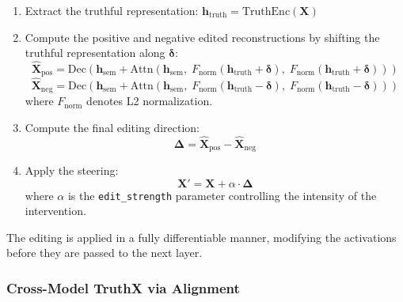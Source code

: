\begin{enumerate}
    \item Extract the truthful representation: $\mathbf{h}_{\mathrm{truth}} = \mathrm{TruthEnc}(\mathbf{X})$
    \item Compute the positive and negative edited reconstructions by shifting the truthful representation along $\boldsymbol{\delta}$:
    \begin{equation}
    \label{eq:truthx_edit_xpos}
    \hat{\mathbf{X}}_{\mathrm{pos}} = \mathrm{Dec}\!\left(\mathbf{h}_{\mathrm{sem}} + \mathrm{Attn}\!\left(\mathbf{h}_{\mathrm{sem}},\; F_{\mathrm{norm}}(\mathbf{h}_{\mathrm{truth}} + \boldsymbol{\delta}),\; F_{\mathrm{norm}}(\mathbf{h}_{\mathrm{truth}} + \boldsymbol{\delta})\right)\right)
    \end{equation}
    \begin{equation}
    \label{eq:truthx_edit_xneg}
    \hat{\mathbf{X}}_{\mathrm{neg}} = \mathrm{Dec}\!\left(\mathbf{h}_{\mathrm{sem}} + \mathrm{Attn}\!\left(\mathbf{h}_{\mathrm{sem}},\; F_{\mathrm{norm}}(\mathbf{h}_{\mathrm{truth}} - \boldsymbol{\delta}),\; F_{\mathrm{norm}}(\mathbf{h}_{\mathrm{truth}} - \boldsymbol{\delta})\right)\right)
    \end{equation}
    where $F_{\mathrm{norm}}$ denotes L2 normalization.
    \item Compute the final editing direction:
    \begin{equation}
    \label{eq:edit_direction}
    \boldsymbol{\Delta} = \hat{\mathbf{X}}_{\mathrm{pos}} - \hat{\mathbf{X}}_{\mathrm{neg}}
    \end{equation}
    \item Apply the steering:
    \begin{equation}
    \label{eq:steering_apply}
    \mathbf{X}' = \mathbf{X} + \alpha \cdot \boldsymbol{\Delta}
    \end{equation}
    where $\alpha$ is the \texttt{edit\_strength} parameter controlling the intensity of the intervention.
\end{enumerate}

The editing is applied in a fully differentiable manner, modifying the activations before they are passed to the next layer. 

\subsubsection{Cross-Model TruthX via Alignment}

